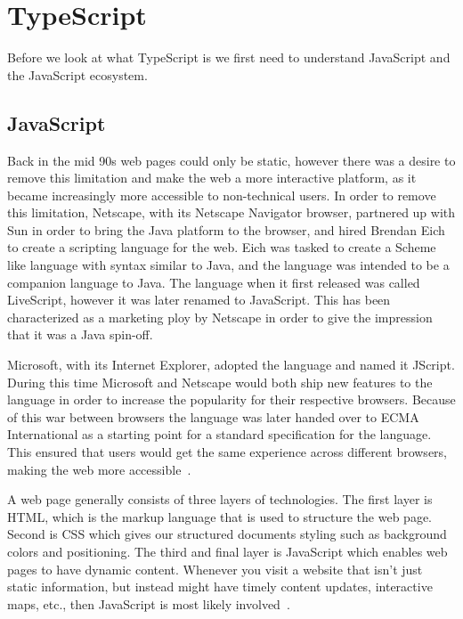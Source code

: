 
\section{TypeScript}\label{sec:typescript}

Before we look at what TypeScript is we first need to understand JavaScript and the JavaScript ecosystem.

\subsection{JavaScript}\label{subsec:javascript}

Back in the mid 90s web pages could only be static, however there was a desire to remove this limitation and make the web a more interactive platform, as it became increasingly more accessible to non-technical users.
In order to remove this limitation, Netscape, with its Netscape Navigator browser, partnered up with Sun in order to bring the Java platform to the browser, and hired Brendan Eich to create a scripting language for the web.
Eich was tasked to create a Scheme like language with syntax similar to Java, and the language was intended to be a companion language to Java.
The language when it first released was called LiveScript, however it was later renamed to JavaScript.
This has been characterized as a marketing ploy by Netscape in order to give the impression that it was a Java spin-off.

Microsoft, with its Internet Explorer, adopted the language and named it JScript.
During this time Microsoft and Netscape would both ship new features to the language in order to increase the popularity for their respective browsers.
Because of this war between browsers the language was later handed over to ECMA International as a starting point for a standard specification for the language.
This ensured that users would get the same experience across different browsers, making the web more accessible~\cite{jswikipedia}.

A web page generally consists of three layers of technologies.
The first layer is HTML, which is the markup language that is used to structure the web page.
Second is CSS which gives our structured documents styling such as background colors and positioning.
The third and final layer is JavaScript which enables web pages to have dynamic content.
Whenever you visit a website that isn't just static information, but instead might have timely content updates, interactive maps, etc., then JavaScript is most likely involved~\cite{whatisjs}.

